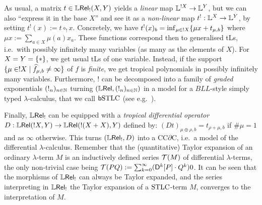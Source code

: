 \documentclass[submission,%
]{eptcs}
\begin{document}
 As usual, a matrix $t\in{\mathbb{L}\mathsf{Rel}_!}(X,Y)$ yields a \emph{linear} map $\mathbb{L}^{!X}\to\mathbb{L}^Y$, but we can also ``express it in the base $X$'' and see it as a \emph{non-linear} map $t^!:\mathbb{L}^X\to\mathbb{L}^Y$, by setting 
 $t^!(x):=t\circ_! x$.
 Concretely, we have $t^!(x)_b=\inf_{\mu\in !X} \{\mu x+ t_{\mu,b}\}$
 where $\mu x:=\sum_{a\in X} \mu(a)x_a$.
 These functions correspond then to generalised tLs, i.e.\ with possibly infinitely many variables (as many as the elements of $X$).
For $X=Y=\{*\}$, we get usual tLs of one variable.
Instead, if the support $\{\mu\in!X\mid\widehat{f}_{\mu,b}\neq\infty\}$ of $f$ is \emph{finite}, we get %
tropical polynomials in possibly infinitely many variables.
Furthermore, $!$ can be decomposed into a family of \emph{graded} exponentials $(!_n)_{n\in\mathbb{N}}$ turning $(\mathbb{L} \mathsf{Rel},(!_n)_{n\in\mathbb{N}})$ in a model for a $\mathit{BLL}$-style simply typed $\lambda$-calculus, that we call $\mathsf b\mathrm{STLC}$ (see e.g.~\cite{Brunel2014}).

 
Finally, $\mathbb{L} \mathsf{Rel}_!$ can be equipped with a \emph{tropical differential operator} $D:{\mathbb{L} \mathsf{Rel}}(!X,Y)\to {\mathbb{L}\mathsf{Rel}}(!(X+X),Y)$ defined by: $(Dt)_{\mu\oplus\rho,b}=t_{\rho+\mu,b}$ if $\#\mu=1$ and as $\infty$ otherwise. %
This turns $(\mathbb{L} \mathsf{Rel}_!,D)$ into a CC$\partial$C, i.e.\ a model of the differential $\lambda$-calculus.
Remember that the (quantitative) Taylor expansion of an ordinary $\lambda$-term $M$ is an inductively defined series $\mathcal{T}(M)$ of differential $\lambda$-terms, the only non-trivial case being $\mathcal{T}(PQ) :=  \sum_{k=0}^{\infty} (\mathsf{D}^{k}[P] \cdot Q^{k})0$.
It can be seen that the morphisms of $\mathbb{L} \mathsf{Rel}_!$ can always be Taylor expanded, and the series interpreting in $\mathbb{L} \mathsf{Rel}_!$ the Taylor expansion of a $\mathrm{STLC}$-term $M$, converges to the interpretation of $M$.

%
%
\end{document}
